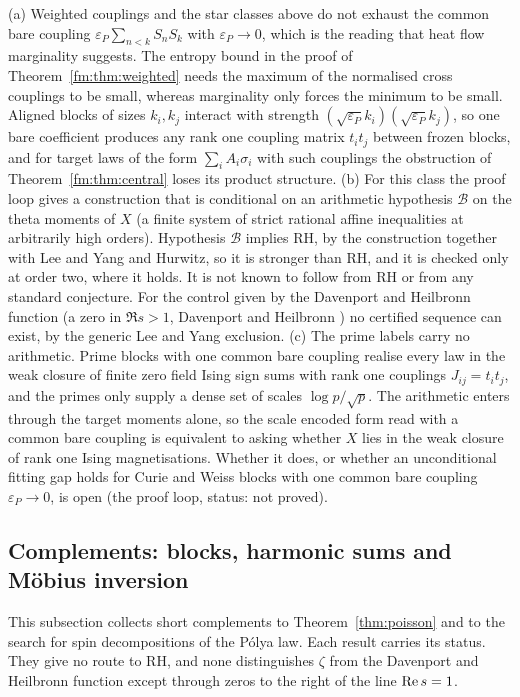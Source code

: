 \begin{remark}\label{fm:rem:bare}
(a) Weighted couplings and the star classes above do not exhaust the common bare coupling $\varepsilon_P\sum_{n<k}S_nS_k$ with $\varepsilon_P\to0$, which is the reading that heat flow marginality suggests. The entropy bound in the proof of Theorem~\ref{fm:thm:weighted} needs the maximum of the normalised cross couplings to be small, whereas marginality only forces the minimum to be small. Aligned blocks of sizes $k_i,k_j$ interact with strength $(\sqrt{\varepsilon_P}k_i)(\sqrt{\varepsilon_P}k_j)$, so one bare coefficient produces any rank one coupling matrix $t_it_j$ between frozen blocks, and for target laws of the form $\sum_iA_i\sigma_i$ with such couplings the obstruction of Theorem~\ref{fm:thm:central} loses its product structure.
(b) For this class the proof loop gives a construction that is conditional on an arithmetic hypothesis $\mathcal B$ on the theta moments of $X$ (a finite system of strict rational affine inequalities at arbitrarily high orders). Hypothesis $\mathcal B$ implies RH, by the construction together with Lee and Yang and Hurwitz, so it is stronger than RH, and it is checked only at order two, where it holds. It is not known to follow from RH or from any standard conjecture. For the control given by the Davenport and Heilbronn function (a zero in $\Re s>1$, Davenport and Heilbronn \cite{DH36}) no certified sequence can exist, by the generic Lee and Yang exclusion.
(c) The prime labels carry no arithmetic. Prime blocks with one common bare coupling realise every law in the weak closure of finite zero field Ising sign sums with rank one couplings $J_{ij}=t_it_j$, and the primes only supply a dense set of scales $\log p/\sqrt p$. The arithmetic enters through the target moments alone, so the scale encoded form read with a common bare coupling is equivalent to asking whether $X$ lies in the weak closure of rank one Ising magnetisations. Whether it does, or whether an unconditional fitting gap holds for Curie and Weiss blocks with one common bare coupling $\varepsilon_P\to0$, is open (the proof loop, status: not proved).
\end{remark}

\subsection{Complements: blocks, harmonic sums and M\"obius inversion}\label{fm:sec:levelrem}

This subsection collects short complements to Theorem~\ref{thm:poisson} and to the search for spin decompositions of the P\'olya law. Each result carries its status. They give no route to RH, and none distinguishes $\zeta$ from the Davenport and Heilbronn function except through zeros to the right of the line $\operatorname{Re} s=1$.

